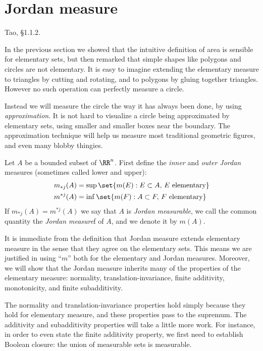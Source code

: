 
\section{Jordan measure}


\begin{reading}
  Tao, \S1.1.2.
\end{reading}

In the previous section we showed that the intuitive definition of area is sensible for elementary sets, but then remarked that simple shapes like polygons and circles are not elementary. It is easy to imagine extending the elementary measure to triangles by cutting and rotating, and to polygons by gluing together triangles. However no such operation can perfectly measure a circle.

Instead we will measure the circle the way it has always been done, by using \emph{approximation}. It is not hard to visualize a circle being approximated by elementary sets, using smaller and smaller boxes near the boundary. The approximation technique will help us measure most traditional geometric figures, and even many blobby thingies.

\begin{defn}
  Let $A$ be a bounded subset of $\RR^n$. First define the \emph{inner} and \emph{outer Jordan} measures (sometimes called lower and upper):
  \begin{align*}
    m_{*j}(A)&=\sup\set{m(E):E\subset A,\, E\text{ elementary}}\\
    m^{*j}(A)&=\inf\set{m(F):A\subset F,\, F\text{ elementary}}
  \end{align*}
  If $m_{*j}(A)=m^{*j}(A)$ we say that $A$ is \emph{Jordan measurable}, we call the common quantity the \emph{Jordan measure}f of $A$, and we denote it by $m(A)$.
\end{defn}

It is immediate from the definition that Jordan measure extends elementary measure in the sense that they agree on the elementary sets. This means we are justified in using ``$m$'' both for the elementary and Jordan measures. Moreover, we will show that the Jordan measure inherits many of the properties of the elementary measure: normality, translation-invariance, finite additivity, monotonicity, and finite subadditivity.

The normality and translation-invariance properties hold simply because they hold for elementary measure, and these properties pass to the supremum. The additivity and subadditivity properties will take a little more work. For instance, in order to even state the finite additivity property, we first need to establish Boolean closure: the union of measurable sets is measurable.

